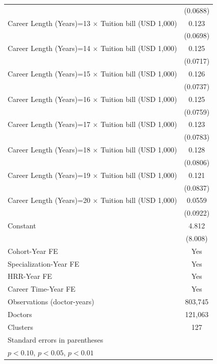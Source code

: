 {\begin{tabular}{l*{1}{c}}
                    &    (0.0688)         \\
[1em]
Career Length (Years)=13 $\times$ Tuition bill (USD 1,000)&       0.123\sym{*}  \\
                    &    (0.0698)         \\
[1em]
Career Length (Years)=14 $\times$ Tuition bill (USD 1,000)&       0.125\sym{*}  \\
                    &    (0.0717)         \\
[1em]
Career Length (Years)=15 $\times$ Tuition bill (USD 1,000)&       0.126\sym{*}  \\
                    &    (0.0737)         \\
[1em]
Career Length (Years)=16 $\times$ Tuition bill (USD 1,000)&       0.125         \\
                    &    (0.0759)         \\
[1em]
Career Length (Years)=17 $\times$ Tuition bill (USD 1,000)&       0.123         \\
                    &    (0.0783)         \\
[1em]
Career Length (Years)=18 $\times$ Tuition bill (USD 1,000)&       0.128         \\
                    &    (0.0806)         \\
[1em]
Career Length (Years)=19 $\times$ Tuition bill (USD 1,000)&       0.121         \\
                    &    (0.0837)         \\
[1em]
Career Length (Years)=20 $\times$ Tuition bill (USD 1,000)&      0.0559         \\
                    &    (0.0922)         \\
[1em]
Constant            &       4.812         \\
                    &     (8.008)         \\
[1em]
Cohort-Year FE      &         Yes         \\
[1em]
Specialization-Year FE&         Yes         \\
[1em]
HRR-Year FE         &         Yes         \\
[1em]
Career Time-Year FE &         Yes         \\
\hline
Observations (doctor-years)&     803,745         \\
Doctors             &     121,063         \\
Clusters            &         127         \\
\hline\hline
\multicolumn{2}{l}{\footnotesize Standard errors in parentheses}\\
\multicolumn{2}{l}{\footnotesize \sym{*} \(p<0.10\), \sym{**} \(p<0.05\), \sym{***} \(p<0.01\)}\\
\end{tabular}
}
